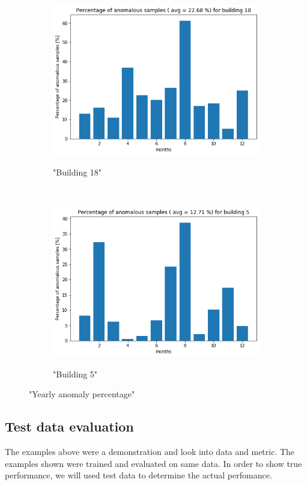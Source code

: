 \begin{figure}[H]
    \begin{subfigure}{.5\textwidth}
		\caption{"Building 18"}
		\includegraphics[width=1\linewidth]{../Figures/EC/b18year.png}
		\label{fig:ec_b18year}
	\end{subfigure}%
    ~ 
    \begin{subfigure}{.5\textwidth}
		\caption{"Building 5"}
		\includegraphics[width=1\linewidth]{../Figures/EC/b5year.png}
		\label{fig:ec_b5year}
	\end{subfigure}%
	\label{fig:ec_year}
	\caption{"Yearly anomaly percentage"}
\end{figure}


\subsection{Test data evaluation}

The examples above were a demonstration and look into data and metric. 
The examples shown were trained and evaluated on same data. 
In order to show true performance, we will used test data to determine the actual perfomance. 

